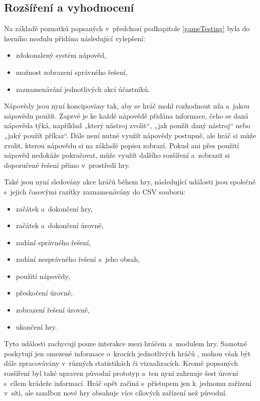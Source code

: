 \documentclass[
  digital, %
  oneside, %
  table,   %
  nolof,     %
  nolot,     %
]{fithesis3}
\begin{document}
\subsection{Rozšíření a vyhodnocení} \label{gameExtensions}
Na základě poznatků popsaných v~předchozí podkapitole \ref{gameTesting} byla do herního modulu přidána následující vylepšení:
\begin{itemize}
  \item zdokonalený systém nápověd,
  \item možnost zobrazení správného řešení,
  \item zaznamenávání jednotlivých akcí účastníků.
\end{itemize}
Nápovědy jsou nyní koncipovány tak, aby se hráč mohl rozhodnout zda a~jakou nápovědu použít. Zaprvé je ke každé nápovědě přidána informace, čeho se daná nápověda týká, například „který nástroj zvolit“, „jak použít daný nástroj“ nebo „jaký použít příkaz“. Dále není nutné využít nápovědy postupně, ale hráč si může zvolit, kterou nápovědu si na základě popisu zobrazí. Pokud ani přes použití nápověd nedokáže pokračovat, může využít dalšího rozšíření a~zobrazit si doporučené řešení přímo v~prostředí hry. \cite{ctfDesign}\par
Také jsou nyní sledovány akce hráčů během hry, následující události jsou společně s~jejich časovými razítky zaznamenávány do CSV souboru:
\begin{itemize}
  \item začátek a~dokončení hry,
  \item začátek a~dokončení úrovně,
  \item zadání správného řešení,
  \item zadání nesprávného řešení a~jeho obsah,
  \item použití nápovědy,
  \item přeskočení úrovně,
  \item zobrazení řešení úrovně,
  \item ukončení hry.
\end{itemize}
Tyto události zachycují pouze interakce mezi hráčem a~modulem hry. Samotné poskytují jen omezené informace o~krocích jednotlivých hráčů \cite{ctfDesign}, mohou však být dále zpracovávány v~různých statistikách či vizualizacích.
Kromě popsaných rozšíření byl také upraven původní prototyp a~ten nyní zahrnuje šest úrovní s~cílem krádeže informací. Hráč opět začíná s~přístupem jen k~jednomu zařízení v~síti, ale sandbox nové hry obsahuje více cílových zařízení než původní.\par
\end{document}
